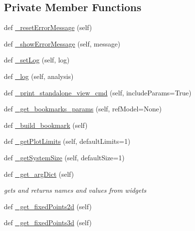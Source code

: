 \subsection*{Private Member Functions}
\begin{DoxyCompactItemize}
\item 
def \hyperlink{class_mu_mo_t_1_1_mu_mo_t_1_1_mu_mo_tview_a6822b561e2f9b618639714cd1545772e}{\+\_\+reset\+Error\+Message} (self)
\item 
def \hyperlink{class_mu_mo_t_1_1_mu_mo_t_1_1_mu_mo_tview_a23d2499d6c6334e35bc4cd7de3dd4d3c}{\+\_\+show\+Error\+Message} (self, message)
\item 
def \hyperlink{class_mu_mo_t_1_1_mu_mo_t_1_1_mu_mo_tview_abfc1e19ed53c088799d1f499bc010f7f}{\+\_\+set\+Log} (self, log)
\item 
def \hyperlink{class_mu_mo_t_1_1_mu_mo_t_1_1_mu_mo_tview_a8b4ffd0e4999bd45c6ca33fe0f40d1e3}{\+\_\+log} (self, analysis)
\item 
def \hyperlink{class_mu_mo_t_1_1_mu_mo_t_1_1_mu_mo_tview_a6bb5bfabb47ee55d6a2bc15d5f4d5647}{\+\_\+print\+\_\+standalone\+\_\+view\+\_\+cmd} (self, include\+Params=True)
\item 
def \hyperlink{class_mu_mo_t_1_1_mu_mo_t_1_1_mu_mo_tview_aea1b653181171af98949b9df4d4cc8c3}{\+\_\+get\+\_\+bookmarks\+\_\+params} (self, ref\+Model=None)
\item 
def \hyperlink{class_mu_mo_t_1_1_mu_mo_t_1_1_mu_mo_tview_a118471f0e7fd4912146ed08084aa4b52}{\+\_\+build\+\_\+bookmark} (self)
\item 
def \hyperlink{class_mu_mo_t_1_1_mu_mo_t_1_1_mu_mo_tview_ab765afe539910b5869f0646dd4a5d915}{\+\_\+get\+Plot\+Limits} (self, default\+Limits=1)
\item 
def \hyperlink{class_mu_mo_t_1_1_mu_mo_t_1_1_mu_mo_tview_abee4df2eb2e49fa8bd5adc2b451b60df}{\+\_\+get\+System\+Size} (self, default\+Size=1)
\item 
def \hyperlink{class_mu_mo_t_1_1_mu_mo_t_1_1_mu_mo_tview_a145c99116673c6b90cc1b2d23e90af93}{\+\_\+get\+\_\+arg\+Dict} (self)
\begin{DoxyCompactList}\small\item\em gets and returns names and values from widgets \end{DoxyCompactList}\item 
def \hyperlink{class_mu_mo_t_1_1_mu_mo_t_1_1_mu_mo_tview_a89e6ad27bf7180f0dce5eb29527e8b73}{\+\_\+get\+\_\+fixed\+Points2d} (self)
\item 
def \hyperlink{class_mu_mo_t_1_1_mu_mo_t_1_1_mu_mo_tview_a52018bf4ba8d3fc732845a0a98b43b26}{\+\_\+get\+\_\+fixed\+Points3d} (self)

\end{DoxyCompactItemize}
